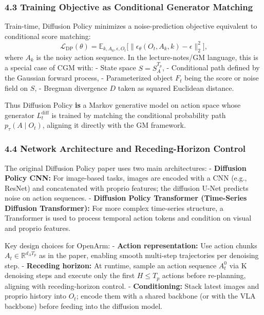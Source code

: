 \documentclass[
]{article}
\theoremstyle{remark}
\begin{document}
\subsubsection{4.3 Training Objective as Conditional Generator
Matching}\label{training-objective-as-conditional-generator-matching}

Train-time, Diffusion Policy minimizes a noise-prediction objective
equivalent to conditional score matching: \cite{diffpolicy-theory-notes,diffusion-policy2023} \[
\mathcal{L}_{\text{DP}}(\theta) = \mathbb{E}_{k, A_0, \epsilon, O_t} \bigl[\lVert \epsilon_\theta(O_t, A_k, k) - \epsilon \rVert_2^2\bigr],
\] where \(A_k\) is the noisy action sequence. In the lecture-notes/GM
language, this is a special case of CGM with: \cite{diffusion-policy-repo,diffpolicy-theory-notes} -
State space \(S = S_A^{T_p}\), - Conditional path defined by the
Gaussian forward process, - Parameterized object \(F_t\) being the score
or noise field on \(S\), - Bregman divergence \(D\) taken as squared
Euclidean distance. \cite{gm-companion-notes,gm2025}

Thus Diffusion Policy \textbf{is} a Markov generative model on action
space whose generator \(L_t^{\text{diff}}\) is trained by matching the
conditional probability path \(p_\tau(A \mid O_t)\), aligning it
directly with the GM framework. \cite{diffpolicy-theory-notes,gm-companion-notes,gm2025}

\subsubsection{4.4 Network Architecture and Receding-Horizon
Control}\label{network-architecture-and-receding-horizon-control}

The original Diffusion Policy paper uses two main
architectures: \cite{diffusion-policy-repo,diffusion-policy2023} - \textbf{Diffusion Policy CNN:}
For image-based tasks, images are encoded with a CNN (e.g., ResNet) and
concatenated with proprio features; the diffusion U-Net predicts noise
on action sequences. - \textbf{Diffusion Policy Transformer (Time-Series
Diffusion Transformer):} For more complex time-series structure, a
Transformer is used to process temporal action tokens and condition on
visual and proprio features.

Key design choices for OpenArm: - \textbf{Action representation:} Use
action chunks \(A_t \in \mathbb{R}^{d_A T_p}\) as in the paper, enabling
smooth multi-step trajectories per denoising step. \cite{diffusion-policy2023,diffpolicy-theory-notes}
- \textbf{Receding horizon:} At runtime, sample an action sequence
\(A_t^{0}\) via K denoising steps and execute only the first
\(H \le T_p\) actions before re-planning, aligning with receding-horizon
control. \cite{diffusion-policy2023,diffpolicy-theory-notes} - \textbf{Conditioning:} Stack latest
images and proprio history into \(O_t\); encode them with a shared
backbone (or with the VLA backbone) before feeding into the diffusion
model. \cite{openvla-notes,diffpolicy-theory-notes}
\end{document}

